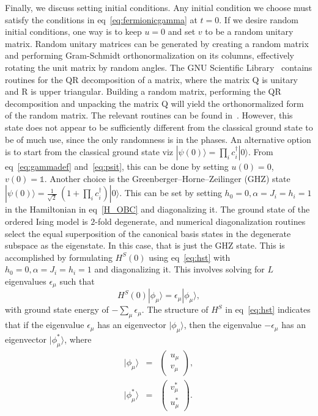\documentclass[a4paper,10pt]{article}
\begin{document}
Finally, we discuss setting initial conditions. Any initial condition we choose must satisfy the conditions in eq~\ref{eq:fermionicgamma} at $t=0$. If we desire random initial conditions, one way is to keep $u=0$ and set $v$ to be a random unitary matrix. Random unitary matrices can be generated by creating a random matrix and performing Gram-Schmidt orthonormalization on its columns, effectively rotating the unit matrix by random angles. The GNU Scientific Library~\cite{galassi:gsl} contains routines for the QR decomposition of a matrix, where the matrix Q is unitary and  R is upper triangular. Building a random matrix, performing the QR decomposition and unpacking the matrix Q will yield the orthonormalized form of the random matrix. The relevant routines can be found in~\cite{gsl:qrdecomp}. However, this state does not appear to be sufficiently different from the classical ground state to be of much use, since the only randomness is in the phases. An alternative option is to start from the classical 
ground state viz $|\psi(0)\rangle = \prod_i c^\dagger_i |0\rangle$. From 
eq~\ref{eq:gammadef} and~\ref{eq:psit}, this can be done by setting $u(0)=0$,$v(0)=\mathds{1}$. Another choice is the Greenberger–Horne–Zeilinger (GHZ) state $|\psi(0)\rangle = \frac{1}{\sqrt{2}}\ \left(1+\prod_i c^\dagger_i\right)|0\rangle$. This can be set by setting  $h_0=0,\alpha= J_i=h_i=1$ in the Hamiltonian in eq~\ref{H_OBC} and diagonalizing it. The ground state of the ordered Ising model is $2$-fold degenerate, and numerical diagonalization routines select the equal superposition of the canonical basis states in the degenerate subspace as the eigenstate. In this case, that is just the GHZ state. This is accomplished by formulating $H^S(0)$ using eq~\ref{eq:hst} with $h_0=0,\alpha= J_i=h_i=1$ and diagonalizing it. This involves solving for $L$ eigenvalues $\epsilon_\mu$ such that
\begin{equation}
H^S(0)|\phi_\mu\rangle  = \epsilon_\mu |\phi_\mu\rangle,
\end{equation}
with ground state energy of $-\sum_\mu \epsilon_\mu$. The structure of $H^S$ in eq~\ref{eq:hst} indicates that if the eigenvalue  $\epsilon_\mu$ has an eigenvector $|\phi_\mu\rangle$, then the  eigenvalue  $-\epsilon_\mu$ has an eigenvector $|\phi^\ast_\mu\rangle$, where
\begin{eqnarray}
|\phi_\mu \rangle &=& \begin{pmatrix}
        u_\mu \\
	v_\mu
       \end{pmatrix},\nonumber \\
|\phi^\ast_\mu \rangle &=& \begin{pmatrix}
        v^\ast_\mu \\
	u^\ast_\mu
       \end{pmatrix}.
\end{eqnarray}
\end{document}
